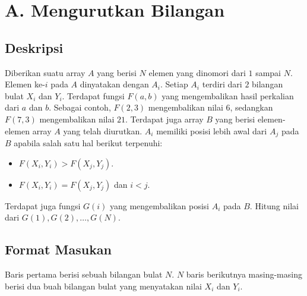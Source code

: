 \documentclass{article}
\begin{document}
\section*{\hfil A. Mengurutkan Bilangan\hfil}


\pagestyle{fancy}
\fancyhf{}
\renewcommand{\headrulewidth}{0pt}

\subsection*{Deskripsi}

\par\noindent Diberikan suatu array $A$ yang berisi $N$ elemen yang dinomori dari $1$ sampai $N$. Elemen ke-$i$ pada $A$ dinyatakan dengan $A_i$. Setiap $A_i$ terdiri dari $2$ bilangan bulat $X_i$ dan $Y_i$. Terdapat fungsi $F(a,b)$ yang mengembalikan hasil perkalian dari $a$ dan $b$. Sebagai contoh, $F(2,3)$ mengembalikan nilai $6$, sedangkan $F(7,3)$ mengembalikan nilai $21$. Terdapat juga array $B$ yang berisi elemen-elemen array $A$ yang telah diurutkan. $A_i$ memiliki posisi lebih awal dari $A_j$ pada $B$ apabila salah satu hal berikut terpenuhi:

\begin{itemize}
	\item $F(X_i,Y_i) > F(X_j, Y_j)$.
	\item $F(X_i,Y_i) = F(X_j, Y_j)$ dan $i < j$.
\end{itemize}

\par\noindent Terdapat juga fungsi $G(i)$ yang mengembalikan posisi $A_i$ pada $B$. Hitung nilai dari $G(1), G(2), \dots , G(N)$. 

\subsection*{Format Masukan}

\par\noindent Baris pertama berisi sebuah bilangan bulat $N$. $N$ baris berikutnya masing-masing berisi dua buah bilangan bulat yang menyatakan nilai $X_i$ dan $Y_i$.
\end{document}
